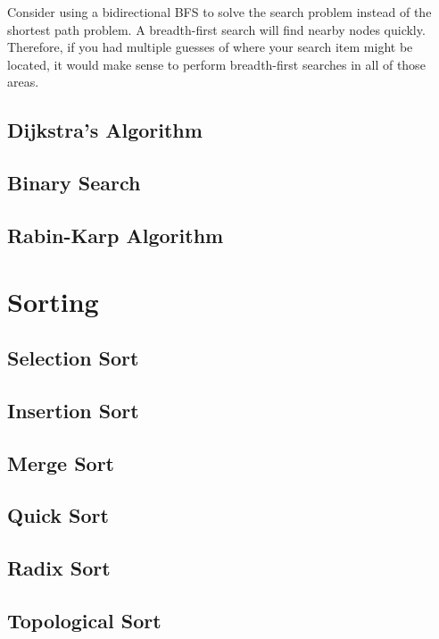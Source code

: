 Consider using a bidirectional BFS to solve the search problem instead of the shortest path problem. A breadth-first search will find nearby nodes quickly. Therefore, if you had multiple guesses of where your search item might be located, it would make sense to perform breadth-first searches in all of those areas.

\subsection{Dijkstra's Algorithm}


\subsection{Binary Search}

\subsection{Rabin-Karp Algorithm}

\section{Sorting}

\subsection{Selection Sort}

\subsection{Insertion Sort}

\subsection{Merge Sort}

\subsection{Quick Sort}

\subsection{Radix Sort}

\subsection{Topological Sort}

